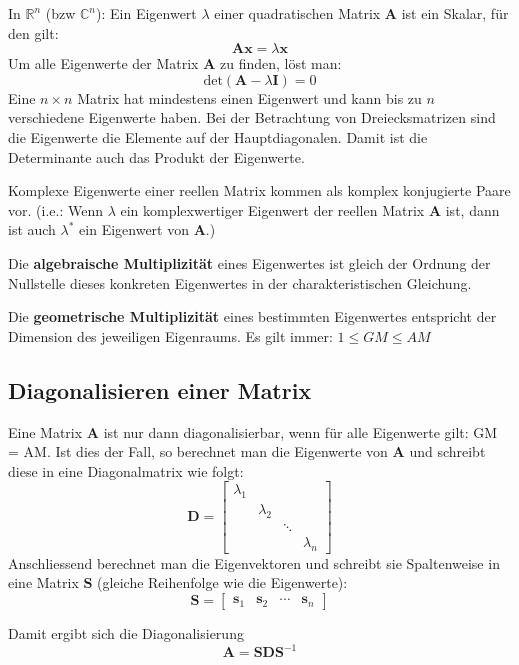 \documentclass[11pt]{article}
\begin{document}
In $\mathbb{R}^n$ (bzw $\mathbb{C}^n$): Ein Eigenwert $\lambda$ einer quadratischen Matrix $\mathbf{A}$ ist ein Skalar, für den gilt:
$$\mathbf{Ax} = \lambda \mathbf{x}$$
Um alle Eigenwerte der Matrix $\mathbf{A}$ zu finden, löst man:
$$\text{det}(\mathbf{A}-\lambda \mathbf{I}) = 0$$
Eine $n \times n$ Matrix hat mindestens einen Eigenwert und kann bis zu $n$ verschiedene Eigenwerte haben. Bei der Betrachtung von Dreiecksmatrizen sind die Eigenwerte die Elemente auf der Hauptdiagonalen. Damit ist die Determinante auch das Produkt der Eigenwerte.

Komplexe Eigenwerte einer reellen Matrix kommen als komplex konjugierte Paare vor. (i.e.: Wenn $\lambda$ ein komplexwertiger Eigenwert der reellen Matrix $\mathbf{A}$ ist, dann ist auch $\lambda^{\ast}$ ein Eigenwert von $\mathbf{A}$.)

Die \textbf{algebraische Multiplizität} eines Eigenwertes ist gleich der Ordnung der Nullstelle dieses konkreten Eigenwertes in der charakteristischen Gleichung.

Die \textbf{geometrische Multiplizität} eines bestimmten Eigenwertes entspricht der Dimension des jeweiligen Eigenraums. Es gilt immer: $1 \leq GM \leq AM$

\subsection*{Diagonalisieren einer Matrix}
\vspace*{-0.5cm}
Eine Matrix $\mathbf{A}$ ist nur dann diagonalisierbar, wenn für alle Eigenwerte gilt: GM = AM. Ist dies der Fall, so berechnet man die Eigenwerte von $\mathbf{A}$ und schreibt diese in eine Diagonalmatrix wie folgt:
$$
\mathbf{D} = \begin{bmatrix}
    \lambda_1 & & & \\
    & \lambda_2 & & \\
    & & \ddots & \\
    & & & \lambda_n
\end{bmatrix}
$$
Anschliessend berechnet man die Eigenvektoren und schreibt sie Spaltenweise in eine Matrix $\mathbf{S}$ (gleiche Reihenfolge wie die Eigenwerte):
$$\mathbf{S} = \begin{bmatrix}
    \mathbf{s}_1 & \mathbf{s}_2 & \cdots & \mathbf{s}_n
\end{bmatrix}
    $$

Damit ergibt sich die Diagonalisierung
$$\mathbf{A} = \mathbf{SDS}^{-1}$$

\pagebreak
\end{document}
